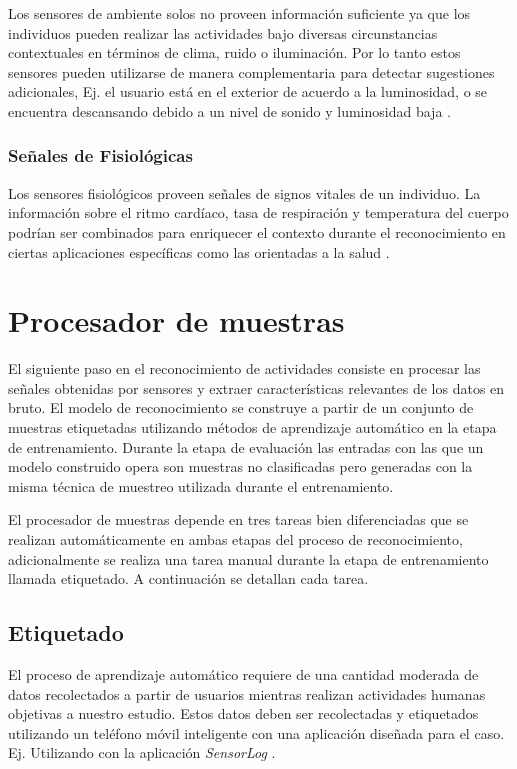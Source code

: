 Los sensores de ambiente solos no proveen información suficiente ya
que los individuos pueden realizar las actividades bajo diversas circunstancias
contextuales en términos de clima, ruido o iluminación. Por lo tanto
estos sensores pueden utilizarse de manera complementaria para detectar
sugestiones adicionales, Ej. el usuario está en el exterior de acuerdo
a la luminosidad, o se encuentra descansando debido a un nivel de
sonido y luminosidad baja \cite{LaraLabrador2013}.

\subsubsection{Señales de Fisiológicas}

Los sensores fisiológicos proveen señales de signos vitales de un
individuo. La información sobre el ritmo cardíaco, tasa de respiración
y temperatura del cuerpo podrían ser combinados para enriquecer el
contexto durante el reconocimiento en ciertas aplicaciones específicas
como las orientadas a la salud \cite{LaraLabrador2013}.

\section{Procesador de muestras}

\label{sec44:proceso-se=0000F1ales}El siguiente paso en el reconocimiento
de actividades consiste en procesar las señales obtenidas por sensores
y extraer características relevantes de los datos en bruto. El modelo
de reconocimiento se construye a partir de un conjunto de muestras
etiquetadas utilizando métodos de aprendizaje automático en la etapa
de entrenamiento. Durante la etapa de evaluación las entradas con
las que un modelo construido opera son muestras no clasificadas pero
generadas con la misma técnica de muestreo utilizada durante el entrenamiento.

El procesador de muestras depende en tres tareas bien diferenciadas
que se realizan automáticamente en ambas etapas del proceso de reconocimiento,
adicionalmente se realiza una tarea manual durante la etapa de entrenamiento
llamada etiquetado. A continuación se detallan cada tarea.

\subsection{Etiquetado}

\label{ssec44:labeling}El proceso de aprendizaje automático requiere
de una cantidad moderada de datos recolectados a partir de usuarios
mientras realizan actividades humanas objetivas a nuestro estudio.
Estos datos deben ser recolectadas y etiquetados utilizando un teléfono
móvil inteligente con una aplicación diseñada para el caso. Ej. Utilizando
 con la aplicación \emph{SensorLog} \cite{GPStore2016s}. 


